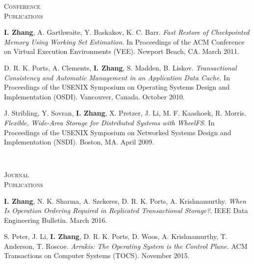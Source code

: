 \documentclass[10pt,times]{report}
\newlength{\sectiongap}
\newlength{\sectioncolwidth}
\newlength{\colgap}
\newlength{\stuffwidth}
\newenvironment{rtable}{
  \begin{minipage}{\textwidth}
  }{
  \end{minipage}
}
\newenvironment{rsection}[1]{
  \begin{minipage}[t]{\sectioncolwidth}
    \textsc{#1}
  \end{minipage}
  \hspace{\colgap}
  \begin{minipage}[t]{\stuffwidth}
  }{
    \removelastskip
  \end{minipage}
  \\[\sectiongap]
}
\begin{document}
\begin{rtable}
\begin{rsection}{Conference\\Publications}
   \textbf{I. Zhang}, A. Garthwaite, Y. Baskakov,
   K. C. Barr. \textit{Fast Restore of Checkpointed Memory Using
     Working Set Estimation.}  In Proceedings of the ACM Conference on
   Virtual Execution Environments (VEE). Newport Beach, CA. March
   2011.\\\vspace{-0.5em}

   D. R. K. Ports, A. Clements, \textbf{I. Zhang}, S. Madden,
   B. Liskov. \textit{Transactional Consistency and Automatic
     Management in an Application Data Cache.}  In Proceedings of the
   USENIX Symposium on Operating Systems Design and Implementation
   (OSDI). Vancouver, Canada. October 2010.\\\vspace{-0.5em}

   J. Stribling, Y. Sovran, \textbf{I. Zhang}, X. Pretzer, J. Li,
   M. F. Kaashoek, R. Morris. \textit{Flexible, Wide-Area Storage for
     Distributed Systems with WheelFS.}  In Proceedings of the USENIX
   Symposium on Networked Systems Design and
   Implementation (NSDI).  Boston, MA. April 2009. \\
  \end{rsection}

  \begin{rsection}{Journal\\Publications}
    \textbf{I. Zhang}, N. K. Sharma, A. Szekeres, D. R. K. Ports,
    A. Krishnamurthy. \textit{When Is Operation Ordering Required in
      Replicated Transactional Storage?}.  IEEE Data Engineering
    Bulletin. March 2016.\\\vspace{-0.5em}

    S. Peter, J. Li, \textbf{I. Zhang}, D. R. K. Ports, D. Woos,
    A. Krishnamurthy, T. Anderson, T. Roscoe.  \textit{Arrakis: The
      Operating System is the Control Plane.}  ACM Transactions on
    Computer Systems (TOCS). November 2015.\\
  \end{rsection}



\end{rtable}
\end{document}
